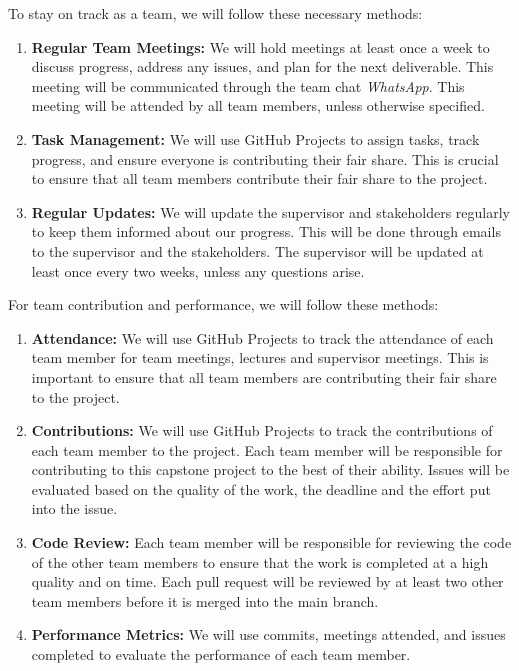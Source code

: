 \documentclass{article}
\begin{document}

\fi

To stay on track as a team, we will follow these necessary methods:

\begin{enumerate}
  \item \textbf{Regular Team Meetings:} We will hold meetings at least once a week to discuss progress, address any issues, and plan for the next deliverable. This meeting will be communicated through the team chat \textit{WhatsApp}. This meeting will be attended by all team members, unless otherwise specified.
  \item \textbf{Task Management:} We will use GitHub Projects to assign tasks, track progress, and ensure everyone is contributing their fair share. This is crucial to ensure that all team members contribute their fair share to the project.
  \item \textbf{Regular Updates:} We will update the supervisor and stakeholders regularly to keep them informed about our progress. This will be done through emails to the supervisor and the stakeholders. The supervisor will be updated at least once every two weeks, unless any questions arise.
\end{enumerate}

For team contribution and performance, we will follow these methods:

\begin{enumerate}
  \item \textbf{Attendance:} We will use GitHub Projects to track the attendance of each team member for team meetings, lectures and supervisor meetings. This is important to ensure that all team members are contributing their fair share to the project.
  \item \textbf{Contributions:} We will use GitHub Projects to track the contributions of each team member to the project. Each team member will be responsible for contributing to this capstone project to the best of their ability. Issues will be evaluated based on the quality of the work, the deadline and the effort put into the issue.
  \item \textbf{Code Review:} Each team member will be responsible for reviewing the code of the other team members to ensure that the work is completed at a high quality and on time. Each pull request will be reviewed by at least two other team members before it is merged into the main branch.
  \item \textbf{Performance Metrics:} We will use commits, meetings attended, and issues completed to evaluate the performance of each team member.
\end{enumerate}
\end{document}
